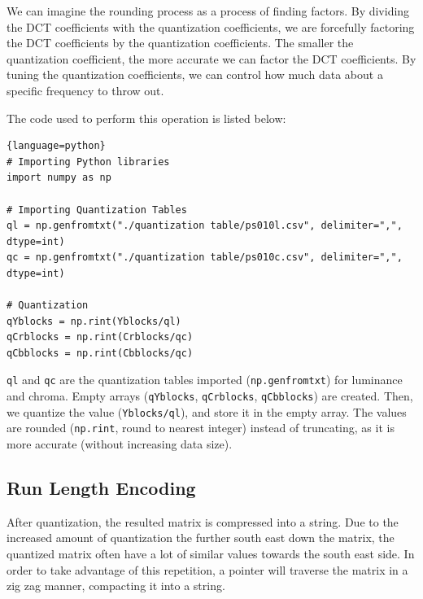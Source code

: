 \documentclass{article}
\begin{document}
We can imagine the rounding process as a process of finding factors.
By dividing the DCT coefficients with the quantization coefficients, we are forcefully factoring the DCT coefficients by the quantization coefficients.
The smaller the quantization coefficient, the more accurate we can factor the DCT coefficients.
By tuning the quantization coefficients, we can control how much data about a specific frequency to throw out.

The code used to perform this operation is listed below:
\begin{lstlisting}{language=python}
# Importing Python libraries
import numpy as np

# Importing Quantization Tables
ql = np.genfromtxt("./quantization table/ps010l.csv", delimiter=",", dtype=int)
qc = np.genfromtxt("./quantization table/ps010c.csv", delimiter=",", dtype=int)

# Quantization
qYblocks = np.rint(Yblocks/ql)
qCrblocks = np.rint(Crblocks/qc)
qCbblocks = np.rint(Cbblocks/qc)
\end{lstlisting}

\texttt{ql} and \texttt{qc} are the quantization tables imported (\texttt{np.genfromtxt}) for luminance and chroma.
Empty arrays (\texttt{qYblocks}, \texttt{qCrblocks}, \texttt{qCbblocks}) are created.
Then, we quantize the value (\texttt{Yblocks/ql}), and store it in the empty array.
The values are rounded (\texttt{np.rint}, round to nearest integer) instead of truncating, as it is more accurate (without increasing data size).

\subsection{Run Length Encoding}
After quantization, the resulted matrix is compressed into a string.
Due to the increased amount of quantization the further south east down the matrix, the quantized matrix often have a lot of similar values towards the south east side.
In order to take advantage of this repetition, a pointer will traverse the matrix in a zig zag manner, compacting it into a string.
\end{document}
